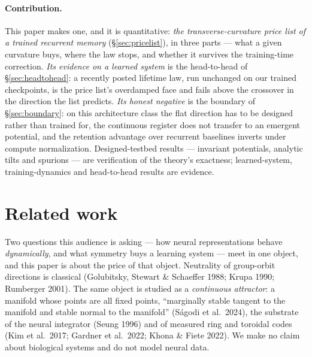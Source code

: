 \documentclass{article}
\begin{document}
\paragraph{Contribution.} This paper makes one, and it is quantitative: \emph{the transverse-curvature price list of a trained recurrent memory} (\S\ref{sec:pricelist}), in three parts --- what a given curvature buys, where the law stops, and whether it survives the training-time correction. \emph{Its evidence on a learned system} is the head-to-head of \S\ref{sec:headtohead}: a recently posted lifetime law, run unchanged on our trained checkpoints, is the price list's overdamped face and fails above the crossover in the direction the list predicts. \emph{Its honest negative} is the boundary of \S\ref{sec:boundary}: on this architecture class the flat direction has to be designed rather than trained for, the continuous register does not transfer to an emergent potential, and the retention advantage over recurrent baselines inverts under compute normalization. Designed-testbed results --- invariant potentials, analytic tilts and spurions --- are verification of the theory's exactness; learned-system, training-dynamics and head-to-head results are evidence.

\section{Related work}\label{sec:related}

Two questions this audience is asking --- how neural representations behave \emph{dynamically}, and what symmetry buys a learning system --- meet in one object, and this paper is about the price of that object. Neutrality of group-orbit directions is classical (Golubitsky, Stewart \& Schaeffer 1988; Krupa 1990; Rumberger 2001). The same object is studied as a \emph{continuous attractor}: a manifold whose points are all fixed points, ``marginally stable tangent to the manifold and stable normal to the manifold'' (S\'agodi et al.\ 2024), the substrate of the neural integrator (Seung 1996) and of measured ring and toroidal codes (Kim et al.\ 2017; Gardner et al.\ 2022; Khona \& Fiete 2022). We make no claim about biological systems and do not model neural data.
\end{document}
